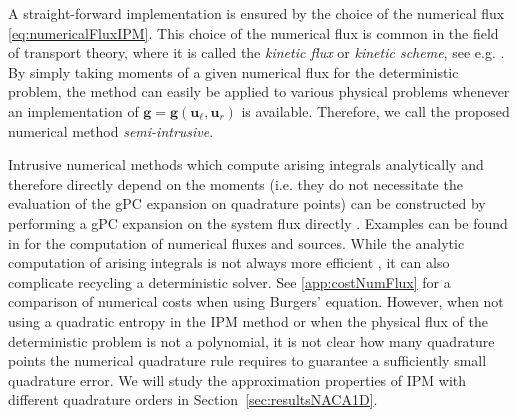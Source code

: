 A straight-forward implementation is ensured by the choice of the numerical flux \eqref{eq:numericalFluxIPM}. This choice of the numerical flux is common in the field of transport theory, where it is called the \textit{kinetic flux} or \textit{kinetic scheme}, see e.g. \cite{deshpande1986kinetic,harten1983upstream,perthame1990boltzmann,perthame1992second}. By simply taking moments of a given numerical flux for the deterministic problem, the method can easily be applied to various physical problems whenever an implementation of $\bm g = \bm g(\bm u_\ell, \bm u_r)$ is available. Therefore, we call the proposed numerical method \textit{semi-intrusive}.

Intrusive numerical methods which compute arising integrals analytically and therefore directly depend on the moments (i.e. they do not necessitate the evaluation of the gPC expansion on quadrature points) can be constructed by performing a gPC expansion on the system flux directly \cite{debusschere2004numerical}. Examples can be found in \cite{hu2015stochastic,hu2016stochastic,tryoen2010instrusive,durrwachterahigh} for the computation of numerical fluxes and sources. While the analytic computation of arising integrals is not always more efficient \cite[Section 6]{ghanem1998stochastic}, it can also complicate recycling a deterministic solver. See \ref{app:costNumFlux} for a comparison of numerical costs when using Burgers' equation. However, when not using a quadratic entropy in the IPM method or when the physical flux of the deterministic problem is not a polynomial, it is not clear how many quadrature points the numerical quadrature rule requires to guarantee a sufficiently small quadrature error. We will study the approximation properties of IPM with different quadrature orders in Section~\ref{sec:resultsNACA1D}.